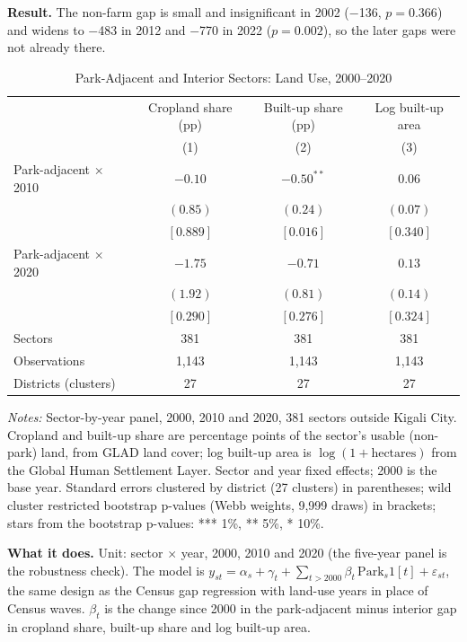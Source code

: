\documentclass[11pt]{article}
\begin{document}
\textbf{Result.} The non-farm gap is small and insignificant in 2002 ($-$136, $p=0.366$) and widens to $-$483 in 2012 and $-$770 in 2022 ($p=0.002$), so the later gaps were not already there.
\clearpage
\begin{table}[H]
\centering\small\setlength{\tabcolsep}{4pt}
\caption{Park-Adjacent and Interior Sectors: Land Use, 2000--2020}
\label{tab:land}
\begin{tabular}{lccc}
\toprule
 & Cropland share (pp) & Built-up share (pp) & Log built-up area \\
 & (1) & (2) & (3) \\
\midrule
Park-adjacent $\times$ 2010 & $-0.10$ & $-0.50^{**}$ & $0.06$ \\
 & $(0.85)$ & $(0.24)$ & $(0.07)$ \\
 & $[0.889]$ & $[0.016]$ & $[0.340]$ \\
Park-adjacent $\times$ 2020 & $-1.75$ & $-0.71$ & $0.13$ \\
 & $(1.92)$ & $(0.81)$ & $(0.14)$ \\
 & $[0.290]$ & $[0.276]$ & $[0.324]$ \\
\midrule
Sectors & 381 & 381 & 381 \\
Observations & 1,143 & 1,143 & 1,143 \\
Districts (clusters) & 27 & 27 & 27 \\
\bottomrule
\end{tabular}
\begin{minipage}{0.95\textwidth}\footnotesize
\textit{Notes:} Sector-by-year panel, 2000, 2010 and 2020, 381 sectors outside Kigali City. Cropland and built-up share are percentage points of the sector's usable (non-park) land, from GLAD land cover; log built-up area is $\log(1+\text{hectares})$ from the Global Human Settlement Layer. Sector and year fixed effects; 2000 is the base year. Standard errors clustered by district (27 clusters) in parentheses; wild cluster restricted bootstrap p-values (Webb weights, 9,999 draws) in brackets; stars from the bootstrap p-values: *** 1\%, ** 5\%, * 10\%.
\end{minipage}
\end{table}
\textbf{What it does.} Unit: sector $\times$ year, 2000, 2010 and 2020 (the five-year panel is the robustness check). The model is $y_{st} = \alpha_s + \gamma_t + \sum_{t>2000}\beta_t\,\mathrm{Park}_s 1[t] + \varepsilon_{st}$, the same design as the Census gap regression with land-use years in place of Census waves. $\beta_t$ is the change since 2000 in the park-adjacent minus interior gap in cropland share, built-up share and log built-up area.
\end{document}
